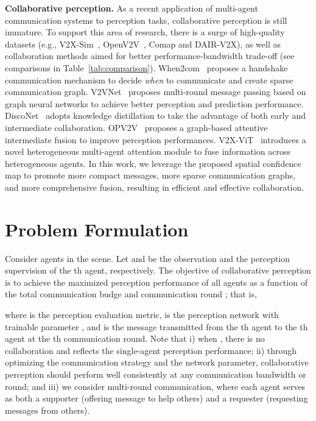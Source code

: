 \documentclass{article}
\begin{document}
\textbf{Collaborative perception.}
As a recent application of multi-agent communication systems to perception tasks, collaborative perception is still immature. To support this area of research, there is a surge of high-quality datasets (e.g., V2X-Sim~\cite{V2XSim}, OpenV2V~\cite{OPV2V}, Comap\cite{comap} and DAIR-V2X\cite{dair}), as well as collaboration methods aimed for better performance-bandwidth trade-off (see comparisons in Table~\ref{tab:comparison}). When2com~\cite{when2com} proposes a handshake communication mechanism to decide \textit{when} to communicate and create sparse communication graph. V2VNet~\cite{v2vnet} proposes multi-round message passing based on graph neural networks to achieve better perception and prediction performance. DiscoNet~\cite{disconet} adopts knowledge distillation to take the advantage of both early and intermediate collaboration. OPV2V~\cite{OPV2V} proposes a graph-based attentive intermediate fusion to improve perception performances. V2X-ViT~\cite{xu2022v2x} introduces a novel heterogeneous multi-agent attention module to fuse information across heterogeneous agents. In this work, we leverage the proposed spatial confidence map to promote more compact messages, more sparse communication graphs, and more comprehensive fusion, resulting in efficient and effective collaboration. 
%
 \vspace{-3mm}
\section{Problem Formulation}
\label{sec:ProblemForm}
\vspace{-2mm}
Consider  agents in the scene. Let  and  be the observation and the perception supervision of the th agent, respectively. The objective of collaborative perception is to achieve the maximized perception performance of all agents as a function of the total communication budge  and communication round ; that is,
\vspace{-1mm}

where  is the perception evaluation metric,  is the perception network with trainable parameter , and  is the message transmitted from the th agent to the th agent at the th communication round. Note that i) when , there is no collaboration and  reflects the single-agent perception performance; ii) through optimizing the communication strategy and the network parameter, collaborative perception should perform well consistently at any communication bandwidth or round; and iii) we consider multi-round communication, where each agent serves as both a supporter (offering message to help others) and a requester (requesting messages from others).
\end{document}
